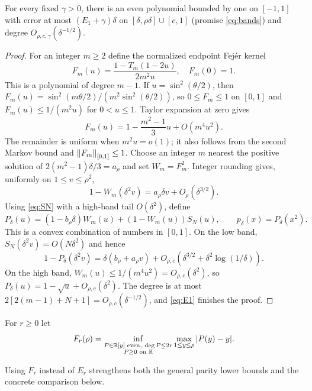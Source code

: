 \begin{proposition}\label{prop:even-upper}
For every fixed $\gamma>0$, there is an even polynomial bounded by one on $[-1,1]$ with error at most $(E_1+\gamma)\delta$ on $[\delta,\rho\delta]\cup[c,1]$ (promise \eqref{eq:bands}) and degree $O_{\rho,c,\gamma}(\delta^{-1/2})$.
\end{proposition}
\begin{proof}
For an integer $m\geq2$ define the normalized endpoint Fej\'er kernel
\[
 F_m(u)=\frac{1-T_m(1-2u)}{2m^2u},\quad F_m(0)=1.
\]
This is a polynomial of degree $m-1$. If $u=\sin^2(\theta/2)$, then
$F_m(u)=\sin^2(m\theta/2)/(m^2\sin^2(\theta/2))$, so
$0\leq F_m\leq1$ on $[0,1]$ and $F_m(u)\leq1/(m^2u)$ for $0<u\leq1$.
Taylor expansion at zero gives
\[
 F_m(u)=1-\frac{m^2-1}{3}u+O(m^4u^2).
\]
The remainder is uniform when $m^2u=o(1)$; it also follows from the second Markov bound and $\left\lVert F_m\right\rVert_{[0,1]}\leq1$.
Choose an integer $m$ nearest the positive solution of
$2(m^2-1)\delta/3=a_\rho$ and set $W_m=F_m^2$. Integer rounding gives, uniformly on $1\leq v\leq\rho^2$,
\[
 1-W_m(\delta^2v)=a_\rho\delta v+O_\rho(\delta^{3/2}).
\]
Using \eqref{eq:SN} with a high-band tail $O(\delta^2)$, define
\[
 P_\delta(u)=(1-b_\rho\delta)W_m(u)+(1-W_m(u))S_N(u),
 \qquad p_\delta(x)=P_\delta(x^2).
\]
This is a convex combination of numbers in $[0,1]$. On the low band, $S_N(\delta^2v)=O(N\delta^2)$ and hence
\[
 1-P_\delta(\delta^2v)=\delta(b_\rho+a_\rho v)
 +O_{\rho,c}(\delta^{3/2}+\delta^2\log(1/\delta)).
\]
On the high band, $W_m(u)\leq1/(m^4u^2)=O_{\rho,c}(\delta^2)$, so $P_\delta(u)=1-\sqrt u+O_{\rho,c}(\delta^2)$. The degree is at most $2[2(m-1)+N+1]=O_{\rho,c}(\delta^{-1/2})$, and \eqref{eq:E1} finishes the proof.
\end{proof}
\begin{definition}\label{def:even-thresholds}
For $r\geq0$ let
\[
 F_r(\rho)=\inf_{\substack{P\in\R[y]\text{ even},\ \deg P\leq2r\\
                          P\geq0\text{ on }\R}}
                   \max_{1\leq y\leq\rho}|P(y)-y|.
\]
\end{definition}
Using $F_r$ instead of $E_r$ strengthens both the general parity lower bounds and the concrete comparison below.

